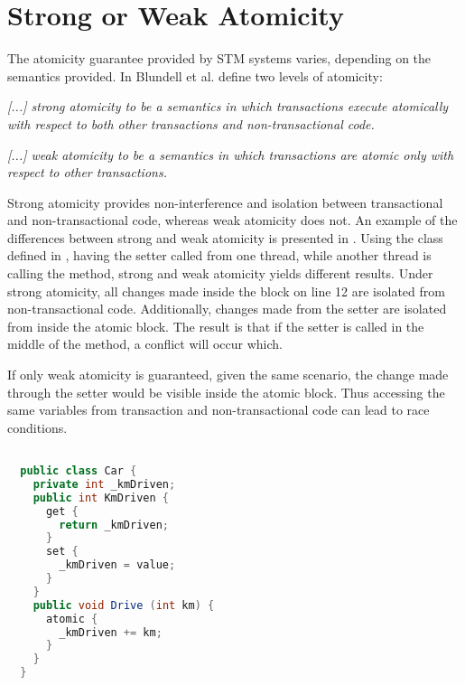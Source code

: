 \section{Strong or Weak Atomicity}
\label{sec:design_strong_weak_atomicity}
The atomicity guarantee provided by \ac{STM} systems varies, depending on the semantics provided. In \cite{blundell2006subtleties} Blundell et al. define two levels of atomicity:
%
\begin{defn}\label{def:strong_atomicity}
\emph{[...] strong atomicity to be a semantics in which transactions execute atomically
with respect to both other transactions and non-transactional code.}
\end{defn}
%
\begin{defn}\label{def:weak_atomicity}
\emph{[...] weak atomicity to be a semantics in which transactions are atomic only with respect to other transactions.}
\end{defn}

Strong atomicity provides non-interference and isolation between transactional and non-transactional code, whereas weak atomicity does not. An example of the differences between strong and weak atomicity is presented in . Using the  class defined in , having the  setter called from one thread, while another thread is calling the  method, strong and weak atomicity yields different results. Under strong atomicity, all changes made inside the  block on line 12 are isolated from non-transactional code. Additionally, changes made from the setter are isolated from inside the atomic block. The result is that if the setter is called in the middle of the  method, a conflict will occur which.

If only weak atomicity is guaranteed, given the same scenario, the change made through the setter would be visible inside the atomic block. Thus accessing the same variables from transaction and non-transactional code can lead to race conditions.
%

\begin{lstlisting}[label=lst:atomicity,
 caption={Level of Atomicity},
 language=Java, 
 showspaces=false,
 showtabs=false,
 breaklines=true,
 showstringspaces=false,
 breakatwhitespace=true,
 commentstyle=\color{greencomments},
 keywordstyle=\color{bluekeywords},
 stringstyle=\color{redstrings},
 morekeywords={atomic, retry, orElse, var, get, set}]  % Start your code-block

  public class Car {
    private int _kmDriven;
    public int KmDriven {
      get {
        return _kmDriven;
      }
      set {
        _kmDriven = value;
      }
    }
    public void Drive (int km) {
      atomic {
        _kmDriven += km;
      }
    }
  }
\end{lstlisting}

